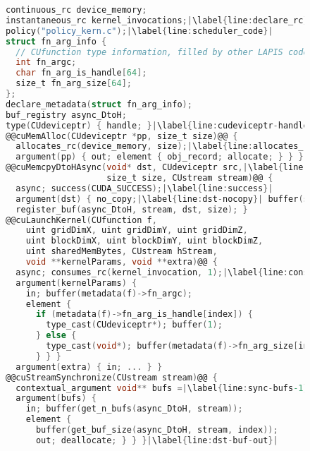 
\begin{figure}
\begin{lstlisting}[language=C,style=nwspecc,columns=flexible,belowskip=-0.5em,aboveskip=-0.5em,mathescape,basicstyle={\scriptsize\ttfamily}]
continuous_rc device_memory;
instantaneous_rc kernel_invocations;|\label{line:declare_rc}|
policy("policy_kern.c");|\label{line:scheduler_code}|
struct fn_arg_info {
  // CUfunction type information, filled by other LAPIS code
  int fn_argc;
  char fn_arg_is_handle[64];
  size_t fn_arg_size[64];
};
declare_metadata(struct fn_arg_info);
buf_registry async_DtoH;
type(CUdeviceptr) { handle; }|\label{line:cudeviceptr-handle}|
@@cuMemAlloc(CUdeviceptr *pp, size_t size)@@ { 
  allocates_rc(device_memory, size);|\label{line:allocates_rc}|
  argument(pp) { out; element { obj_record; allocate; } } }
@@cuMemcpyDtoHAsync(void* dst, CUdeviceptr src,|\label{line:cuMemcpyDtoHAsync}| 
                    size_t size, CUstream stream)@@ {
  async; success(CUDA_SUCCESS);|\label{line:success}|
  argument(dst) { no_copy;|\label{line:dst-nocopy}| buffer(size); lifetime_manual; }
  register_buf(async_DtoH, stream, dst, size); }
@@cuLaunchKernel(CUfunction f,
    uint gridDimX, uint gridDimY, uint gridDimZ,
    uint blockDimX, uint blockDimY, uint blockDimZ,
    uint sharedMemBytes, CUstream hStream,
    void **kernelParams, void **extra)@@ {
  async; consumes_rc(kernel_invocation, 1);|\label{line:consume_rc}|
  argument(kernelParams) {
    in; buffer(metadata(f)->fn_argc);
    element {
      if (metadata(f)->fn_arg_is_handle[index]) {
        type_cast(CUdeviceptr*); buffer(1);
      } else {
        type_cast(void*); buffer(metadata(f)->fn_arg_size[index]);
      } } }
  argument(extra) { in; ... } }
@@cuStreamSynchronize(CUstream stream)@@ {
  contextual_argument void** bufs =|\label{line:sync-bufs-1}| get_bufs(async_DtoH, stream);|\label{line:sync-bufs-2}|
  argument(bufs) {
    in; buffer(get_n_bufs(async_DtoH, stream));
    element { 
      buffer(get_buf_size(async_DtoH, stream, index));
      out; deallocate; } } }|\label{line:dst-buf-out}|
\end{lstlisting}
\caption{
}
\end{figure}
